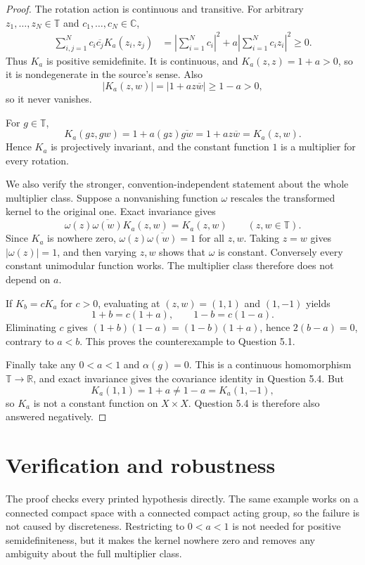 \documentclass[11pt]{article}
\begin{document}
\begin{proof}
The rotation action is continuous and transitive.  For arbitrary
$z_1,\ldots,z_N\in\mathbb T$ and $c_1,\ldots,c_N\in\mathbb C$,
\begin{align*}
 \sum_{i,j=1}^N c_i\overline{c_j}K_a(z_i,z_j)
 &=\left|\sum_{i=1}^N c_i\right|^2
   +a\left|\sum_{i=1}^N c_i z_i\right|^2\geq0.
\end{align*}
Thus $K_a$ is positive semidefinite.  It is continuous, and
$K_a(z,z)=1+a>0$, so it is nondegenerate in the source's sense.  Also
\[
 |K_a(z,w)|=|1+a z\overline w|\geq1-a>0,
\]
so it never vanishes.

For $g\in\mathbb T$,
\[
 K_a(gz,gw)=1+a(gz)\overline{gw}
            =1+a z\overline w=K_a(z,w).
\]
Hence $K_a$ is projectively invariant, and the constant function $1$ is a
multiplier for every rotation.

We also verify the stronger, convention-independent statement about the
whole multiplier class.  Suppose a nonvanishing function $\omega$ rescales
the transformed kernel to the original one.  Exact invariance gives
\[
 \omega(z)\overline{\omega(w)}K_a(z,w)=K_a(z,w)
 \qquad(z,w\in\mathbb T).
\]
Since $K_a$ is nowhere zero,
$\omega(z)\overline{\omega(w)}=1$ for all $z,w$.  Taking $z=w$ gives
$|\omega(z)|=1$, and then varying $z,w$ shows that $\omega$ is constant.
Conversely every constant unimodular function works.  The multiplier class
therefore does not depend on $a$.

If $K_b=cK_a$ for $c>0$, evaluating at $(z,w)=(1,1)$ and $(1,-1)$ yields
\[
 1+b=c(1+a),\qquad 1-b=c(1-a).
\]
Eliminating $c$ gives
$(1+b)(1-a)=(1-b)(1+a)$, hence $2(b-a)=0$, contrary to $a<b$.
This proves the counterexample to Question 5.1.

Finally take any $0<a<1$ and $\alpha(g)=0$.  This is a continuous
homomorphism $\mathbb T\to\mathbb R$, and exact invariance gives the covariance
identity in Question 5.4.  But
\[
 K_a(1,1)=1+a\neq1-a=K_a(1,-1),
\]
so $K_a$ is not a constant function on $X\times X$.  Question 5.4 is
therefore also answered negatively.
\end{proof}

\section{Verification and robustness}
The proof checks every printed hypothesis directly.  The same example works
on a connected compact space with a connected compact acting group, so the
failure is not caused by discreteness.  Restricting to $0<a<1$ is not needed
for positive semidefiniteness, but it makes the kernel nowhere zero and
removes any ambiguity about the full multiplier class.
\end{document}
